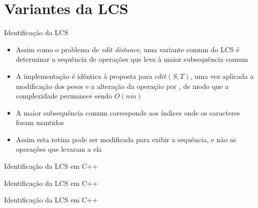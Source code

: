 \section{Variantes da LCS}

\begin{frame}[fragile]{Identificação da LCS}

    \begin{itemize}
        \item Assim como o problema de \textit{edit distance}, uma variante comum do LCS é
            determinar a sequência de operações que leva à maior subsequência comum

        \item A implementação é idêntica à proposta para $edit(S, T)$, uma vez aplicada a 
            modificação dos pesos e a alteração da operação  por 
            , de modo que a complexidade permanece sendo $O(nm)$

        \item A maior subsequência comum corresponde aos índices onde os caracteres foram
            mantidos

        \item Assim esta rotina pode ser modificada para exibir a sequência, e não as operações
            que levaram a ela
    \end{itemize}

\end{frame}

\begin{frame}[fragile]{Identificação da LCS em C++}
\end{frame}

\begin{frame}[fragile]{Identificação da LCS em C++}
\end{frame}

\begin{frame}[fragile]{Identificação da LCS em C++}
\end{frame}


